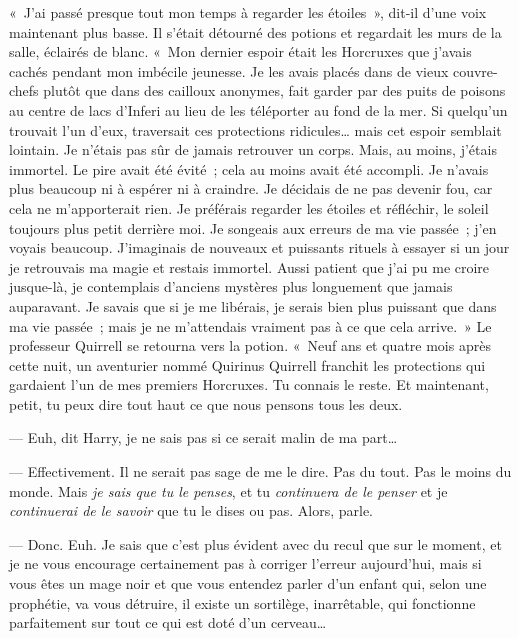 «~J'ai passé presque tout mon temps à regarder les étoiles~», dit-il d'une voix maintenant plus basse.
Il s'était détourné des potions et regardait les murs de la salle, éclairés de blanc.
«~Mon dernier espoir était les Horcruxes que j'avais cachés pendant mon imbécile jeunesse.
Je les avais placés dans de vieux couvre-chefs plutôt que dans des cailloux anonymes, fait garder par des puits de poisons au centre de lacs d'Inferi au lieu de les téléporter au fond de la mer.
Si quelqu'un trouvait l'un d'eux, traversait ces protections ridicules… mais cet espoir semblait lointain.
Je n'étais pas sûr de jamais retrouver un corps.
Mais, au moins, j'étais immortel.
Le pire avait été évité~; cela au moins avait été accompli.
Je n'avais plus beaucoup ni à espérer ni à craindre.
Je décidais de ne pas devenir fou, car cela ne m'apporterait rien.
Je préférais regarder les étoiles et réfléchir, le soleil toujours plus petit derrière moi.
Je songeais aux erreurs de ma vie passée~; j'en voyais beaucoup.
J'imaginais de nouveaux et puissants rituels à essayer si un jour je retrouvais ma magie et restais immortel.
Aussi patient que j'ai pu me croire jusque-là, je contemplais d'anciens mystères plus longuement que jamais auparavant.
Je savais que si je me libérais, je serais bien plus puissant que dans ma vie passée~; mais je ne m'attendais vraiment pas à ce que cela arrive.~»
Le professeur Quirrell se retourna vers la potion.
«~Neuf ans et quatre mois après cette nuit, un aventurier nommé Quirinus Quirrell franchit les protections qui gardaient l'un de mes premiers Horcruxes.
Tu connais le reste.
Et maintenant, petit, tu peux dire tout haut ce que nous pensons tous les deux.

--- Euh, dit Harry, je ne sais pas si ce serait malin de ma part…

--- Effectivement.
Il ne serait pas sage de me le dire.
Pas du tout.
Pas le moins du monde.
Mais \emph{je sais que tu le penses}, et tu \emph{continuera de le penser} et je \emph{continuerai de le savoir} que tu le dises ou pas.
Alors, parle.

--- Donc.
Euh. Je sais que c'est plus évident avec du recul que sur le moment, et je ne vous encourage certainement pas à corriger l'erreur aujourd'hui, mais si vous êtes un mage noir et que vous entendez parler d'un enfant qui, selon une prophétie, va vous détruire, il existe un sortilège, inarrêtable, qui fonctionne parfaitement sur tout ce qui est doté d'un cerveau…

